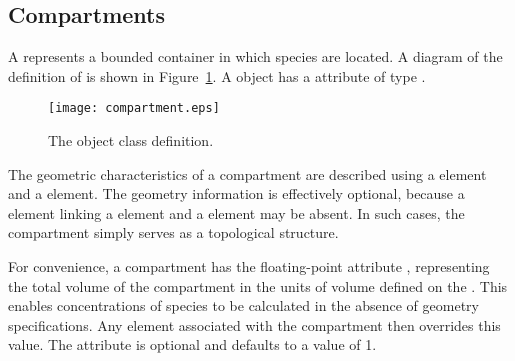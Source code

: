 \documentclass[10pt]{cek-article}
\begin{document}


\subsection{Compartments}

A  represents a bounded container in which species are
located.  A diagram of the definition of  is shown in
Figure~\ref{fig:compartment}.  A  object has a
 attribute of type .

\begin{figure}[htb]
  \centering
  \texttt{[image: compartment.eps]}
  \caption{The  object class definition.}
  \label{fig:compartment}
\end{figure}

\newpage

The geometric characteristics of a compartment are described using a
 element and a  element.  The geometry
information is effectively optional, because a  element
linking a  element and a  element may be
absent.  In such cases, the compartment simply serves as a topological
structure.

For convenience, a compartment has the floating-point attribute
, representing the total volume of the compartment in the
units of volume defined on the .  This enables concentrations
of species to be calculated in the absence of geometry specifications.  Any
 element associated with the compartment then overrides
this value.  The  attribute is optional and defaults to a
value of 1.
\end{document}
